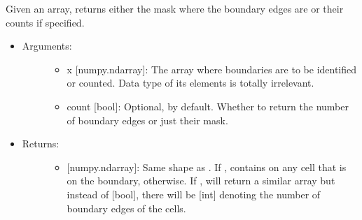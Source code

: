 \documentclass[letterpaper,10pt,english]{sphinxmanual}
\begin{document}
\begin{fulllineitems}
\label{\detokenize{spatial:data_tools.spatial.get_boundaries}}
Given an array, returns either the mask where the boundary edges are
or their counts if specified.
\begin{itemize}
\item {} \begin{description}
\item[{Arguments:}] \leavevmode\begin{itemize}
\item {} 
x {[}numpy.ndarray{]}: The array where boundaries are to be
identified or counted. Data type of its elements is totally
irrelevant.

\item {} 
count {[}bool{]}: Optional,  by default. Whether to
return the number of boundary edges or just their mask.

\end{itemize}

\end{description}

\item {} \begin{description}
\item[{Returns:}] \leavevmode\begin{itemize}
\item {} 
{[}numpy.ndarray{]}: Same shape as . If ,
contains  on any cell that is on the boundary,
 otherwise. If , will return a
similar array but instead of {[}bool{]}, there will be {[}int{]}
denoting the number of boundary edges of the cells.

\end{itemize}

\end{description}


\end{itemize}
\end{fulllineitems}
\end{document}

